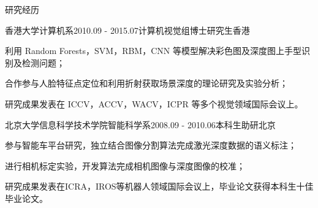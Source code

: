 \documentclass{cv_professional-cn} %
\begin{document}
\begin{rSection}{研究经历}
    
\begin{rSubsection}{香港大学计算机系}{2010.09 - 2015.07}{计算机视觉组博士研究生}{香港}
	\item 利用 Random Forests，SVM，RBM，CNN 等模型解决彩色图及深度图上手型识别及检测问题；
	\item 合作参与人脸特征点定位和利用折射获取场景深度的理论研究及实验分析；
	\item 研究成果发表在 ICCV，ACCV，WACV，ICPR 等多个视觉领域国际会议上。
\end{rSubsection}

\begin{rSubsection}{北京大学信息科学技术学院智能科学系}{2008.09 - 2010.06}{本科生助研}{北京}
 \item 参与智能车平台研究，独立结合图像分割算法完成激光深度数据的语义标注；
 \item 进行相机标定实验，开发算法完成相机图像与深度图像的校准；
 \item 研究成果发表在ICRA，IROS等机器人领域国际会议上，毕业论文获得本科生十佳毕业论文。
\end{rSubsection}

\end{rSection}

\end{document}
